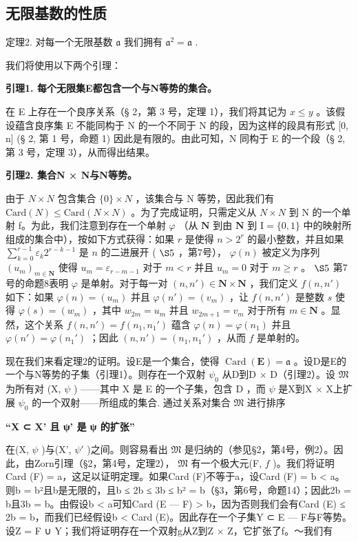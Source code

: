 \subsection{无限基数的性质}

定理2. 对每一个无限基数 \(\mathfrak{a}\) 我们拥有 \(\mathfrak{a}^2 = \mathfrak{a}\) .

我们将使用以下两个引理：

\textbf{引理1. 每个无限集E都包含一个与N等势的集合。}

在 E 上存在一个良序关系（§ 2，第 3 号，定理 1），我们将其记为 \(x \leqslant y\) 。该假设蕴含良序集 E 不能同构于 N 的一个不同于 N 的段，因为这样的段具有形式 {[}0, n{]} (§ 2, 第 1 号，命题 1) 因此是有限的。由此可知，N 同构于 E 的一个段（§ 2, 第 3 号，定理 3），从而得出结果。

\textbf{引理2. 集合N × N与N等势。}

由于 \(N \times N\) 包含集合 \(\{0\} \times N\) ，该集合与 N 等势，因此我们有 \(\text{Card}(N) \leqslant \text{Card}(N \times N)\) 。为了完成证明，只需定义从 \(N \times N\) 到 N 的一个单射 f。为此，我们注意到存在一个单射 \(\varphi\) （从 \(\mathbf{N}\) 到由 \(\mathbf{N}\) 到 \(\mathrm{I} = \{0,1\}\) 中的映射所组成的集合中），按如下方式获得：如果 \(r\) 是使得 \(n > 2^r\) 的最小整数，并且如果 \(\sum_{k=0}^{r-1}\varepsilon_k2^{r-k-1}\) 是 \(n\) 的二进展开 ( \(\S 5\) ，第7号）， \(\varphi(n)\) 被定义为序列 \((u_m)_{m\in\mathbf{N}}\) 使得 \(u_m = \varepsilon_{r-m-1}\) 对于 \(m < r\) 并且 \(u_m = 0\) 对于 \(m \geqslant r\) 。 \(\S 5\) 第7号的命题8表明 \(\varphi\) 是单射。对于每一对 \((n, n') \in \mathbf{N} \times \mathbf{N}\) ，我们定义 \(f(n, n')\) 如下：如果 \(\varphi(n) = (u_m)\) 并且 \(\varphi(n') = (v_m)\) ，让 \(f(n, n')\) 是整数 \(s\) 使得 \(\varphi(s) = (w_m)\) ，其中 \(w_{2m} = u_m\) 并且 \(w_{2m+1} = v_m\) 对于所有 \(m \in \mathbf{N}\) 。显然，这个关系 \(f(n, n') = f(n_1, n_1')\) 蕴含 \(\varphi(n) = \varphi(n_1)\) 并且 \(\varphi(n') = \varphi(n_1')\) ；因此 \((n, n') = (n_1, n_1')\) ，从而 \(f\) 是单射的。

现在我们来看定理2的证明。设E是一个集合，使得 \(\operatorname{Card}(\mathbf{E}) = \mathfrak{a}\) 。设D是E的一个与N等势的子集（引理1）。则存在一个双射 \(\psi_0\) 从D到D × D（引理2）。设 \(\mathfrak{M}\) 为所有对 (X, \(\psi\) ) ——其中 X 是 E 的一个子集，包含 D ，而 \(\psi\) 是X到X × X上扩展 \(\psi_0\) 的一个双射——所组成的集合. 通过关系对集合 \(\mathfrak{M}\) 进行排序

\textbf{“X ⊂ X' 且 ψ' 是 ψ 的扩张”}

在(X, \(\psi\) )与(X', \(\psi'\) )之间。则容易看出 \(\mathfrak{M}\) 是归纳的（参见§2，第4号，例2）。因此，由Zorn引理（§2，第4号，定理2）， \(\mathfrak{M}\) 有一个极大元(F, \(f\) )。我们将证明Card (F) = a，这足以证明定理。如果Card (F)不等于a，设Card (F) = b \textless{} a。则b = b²且b是无限的，且b ≤ 2b ≤ 3b ≤ b² = b（§3，第6号，命题14）；因此2b = b且3b = b。由假设b \textless{} a可知Card (E --- F) \textgreater{} b，因为否则我们会有Card (E) ≤ 2b = b，而我们已经假设b \textless{} Card (E)。因此存在一个子集Y ⊂ E --- F与F等势。设Z = F ∪ Y；我们将证明存在一个双射g从Z到Z × Z，它扩张了f。～我们有

